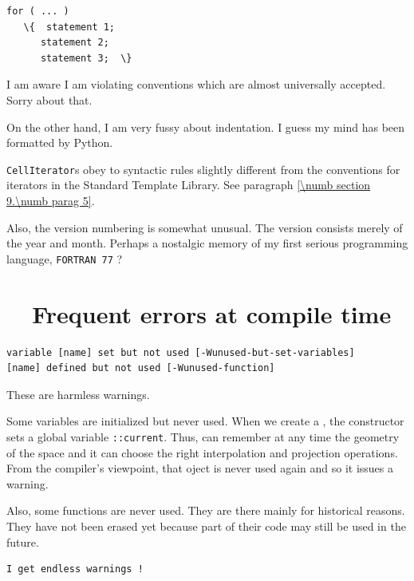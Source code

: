 \begin{Verbatim}[commandchars=\\\{\},formatcom=\small\tt,baselinestretch=0.94]
   for ( ... )
   \{  statement 1;
      statement 2;
      statement 3;  \}
\end{Verbatim}

I am aware I am violating conventions which are almost universally accepted. Sorry about that.

On the other hand, I am very fussy about indentation.
I guess my mind has been formatted by Python.

{\small\tt CellIterator}s obey to syntactic rules slightly different from the conventions for
iterators in the Standard Template Library.
See paragraph \ref{\numb section 9.\numb parag 5}.

Also, the version numbering is somewhat unusual.
The version consists merely of the year and month.
Perhaps a nostalgic memory of my first serious programming language, {\tt FORTRAN 77} ?


\section{~~Frequent errors at compile time}\label{\numb section 11.\numb parag 13}

\begin{Verbatim}[commandchars=\\\{\},formatcom=\small\tt,baselinestretch=0.94]
variable [name] set but not used [-Wunused-but-set-variables]
[name] defined but not used [-Wunused-function]
\end{Verbatim}

These are harmless warnings.

Some variables are initialized but never used.
When we create a {\small\tt {}}, the constructor sets a global variable
{\small\tt {}::current}.
Thus, {\maniFEM} can remember at any time the geometry of the space and it can choose the right
interpolation and projection operations.
From the compiler's viewpoint, that {\small\tt{}} oject is never used again and so it issues
a warning.

Also, some functions are never used.
They are there mainly for historical reasons.
They have not been erased yet because part of their code may still be used in the future.

\begin{Verbatim}[commandchars=\\\{\},formatcom=\normalfont\rmfamily,baselinestretch=0.94]
I get endless warnings !
\end{Verbatim}

